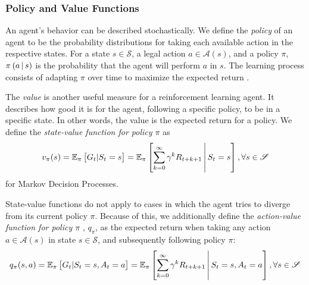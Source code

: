 \subsubsection{Policy and Value Functions}
An agent's behavior can be described stochastically. We define the \textit{policy} of an agent to be the probability distributions for taking each available action in the respective states. For a state $s \in \mathscr{S}$, a legal action $a \in \mathscr{A}(s)$, and a policy $\pi$, $\pi\left(a \,\middle|\, s\right)$ is the probability that the agent will perform $a$ in $s$. The learning process consists of adapting $\pi$ over time to maximize the expected return \cite{bible}.

The \textit{value} is another useful measure for a reinforcement learning agent. It describes how good it is for the agent, following a specific policy, to be in a specific state. In other words, the value is the expected return for a policy. We define the \textit{state-value function for policy $\pi$} \cite{bible} as
\begin{equation*}
    v_\pi(s) = \mathbb{E}_\pi\left[G_t | S_t = s\right]
             = \mathbb{E}_\pi\left[\sum_{k=0}^\infty \gamma^k R_{t+k+1} \,\middle|\, S_t = s\right], \forall s \in \mathscr{S}
\end{equation*}
for Markov Decision Processes.

State-value functions do not apply to cases in which the agent tries to diverge from its current policy $\pi$. Because of this, we additionally define the \textit{action-value function for policy $\pi$} \cite{bible}, $q_\pi$, as the expected return when taking any action $a \in \mathscr{A}(s)$ in state $s \in \mathscr{S}$, and subsequently following policy $\pi$:
\begin{equation*}
    q_\pi(s, a) = \mathbb{E}_\pi\left[G_t | S_t = s, A_t = a\right]
             = \mathbb{E}_\pi\left[\sum_{k=0}^\infty \gamma^k R_{t+k+1} \,\middle|\, S_t = s, A_t = a\right], \forall s \in \mathscr{S}
\end{equation*}